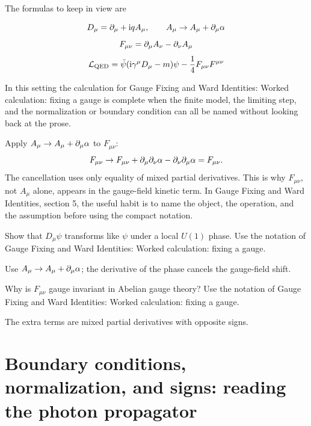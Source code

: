 The formulas to keep in view are

\[
  D_\mu=\partial_\mu+\mathrm i qA_\mu,\qquad A_\mu\to A_\mu+\partial_\mu\alpha
\]
\[
  F_{\mu\nu}=\partial_\mu A_\nu-\partial_\nu A_\mu
\]
\[
  \mathcal L_{\mathrm{QED}}=\bar\psi(\mathrm i\gamma^\mu D_\mu-m)\psi-\frac14F_{\mu\nu}F^{\mu\nu}
\]

In this setting the calculation for Gauge Fixing and Ward Identities: Worked calculation: fixing a gauge is complete when the finite model, the limiting step, and the normalization or boundary condition can all be named without looking back at the prose.




\begin{example}
Apply \(A_\mu\to A_\mu+\partial_\mu\alpha\) to \(F_{\mu\nu}\):
\[
  F_{\mu\nu}\to F_{\mu\nu}+\partial_\mu\partial_\nu\alpha-\partial_\nu\partial_\mu\alpha=F_{\mu\nu}.
\]
The cancellation uses only equality of mixed partial derivatives.  This is why \(F_{\mu\nu}\), not \(A_\mu\) alone, appears in the gauge-field kinetic term.  In Gauge Fixing and Ward Identities, section 5, the useful habit is to name the object, the operation, and the assumption before using the compact notation.
\end{example}



\begin{exercise}
Show that \(D_\mu\psi\) transforms like \(\psi\) under a local \(U(1)\) phase.  Use the notation of Gauge Fixing and Ward Identities: Worked calculation: fixing a gauge.
\begin{answer}
Use \(A_\mu\to A_\mu+\partial_\mu\alpha\); the derivative of the phase cancels the gauge-field shift.
\end{answer}
\end{exercise}

\begin{exercise}
Why is \(F_{\mu\nu}\) gauge invariant in Abelian gauge theory?  Use the notation of Gauge Fixing and Ward Identities: Worked calculation: fixing a gauge.
\begin{answer}
The extra terms are mixed partial derivatives with opposite signs.
\end{answer}
\end{exercise}



\section{Boundary conditions, normalization, and signs: reading the photon propagator}

